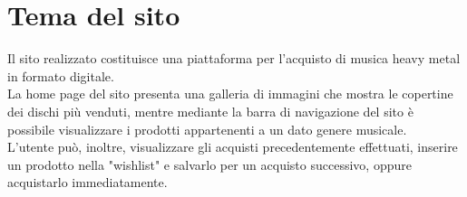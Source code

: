 \section{Tema del sito}
Il sito realizzato costituisce una piattaforma per l'acquisto di musica heavy metal in formato digitale.\\
La home page del sito presenta una galleria di immagini che mostra le copertine dei dischi più venduti, mentre mediante la barra di navigazione del sito è possibile visualizzare i prodotti appartenenti a un dato genere musicale.\\
L'utente può, inoltre, visualizzare gli acquisti precedentemente effettuati, inserire un prodotto nella "wishlist" e salvarlo per un acquisto successivo, oppure acquistarlo immediatamente.